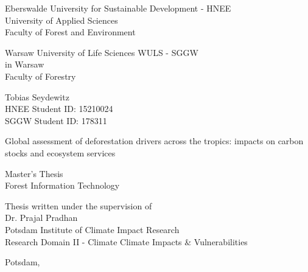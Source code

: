 \begin{titlepage}
	\begin{singlespace}
		\begin{center}
			\Large{Eberswalde University for Sustainable Development - HNEE}\\
			\Large{University of Applied Sciences}\\
			\Large{Faculty of Forest and Environment}
			
			\smallskip

			\Large{Warsaw University of Life Sciences WULS - SGGW}\\
			\Large{in Warsaw}\\
			\Large{Faculty of Forestry}

			\bigskip

			\large{Tobias Seydewitz}\\
			\normalsize{HNEE Student ID: 15210024}\\
			\normalsize{SGGW Student ID: 178311}

			\vspace{2cm}
 
			 \huge{Global assessment of deforestation drivers across the tropics: impacts on carbon stocks and ecosystem services}

			\bigskip

			\large{Master's Thesis}\\
			\large{Forest Information Technology}

			\vspace{2cm}

			\begin{flushright}
				\normalsize{Thesis written under the supervision of}\\
				\normalsize{Dr. Prajal Pradhan}\\
				\normalsize{Potsdam Institute of Climate Impact Research}\\
				\normalsize{Research Domain II - Climate Climate Impacts \& Vulnerabilities}
			\end{flushright}

			\vspace{4.5cm}

			\normalsize{Potsdam, \the\year}
		\end{center}
	\end{singlespace}
\end{titlepage}